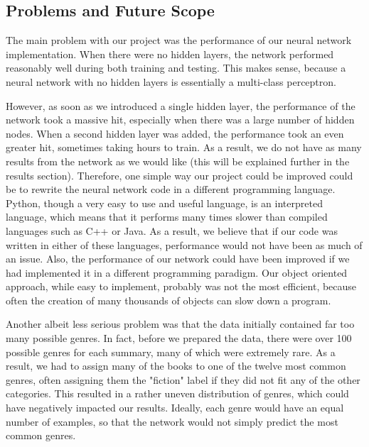 \documentclass[11pt,letterpaper]{article}
\begin{document}
\subsection{Problems and Future Scope}

The main problem with our project was the performance of our neural network implementation. When there were no hidden layers, the network performed reasonably well during both training and testing. This makes sense, because a neural network with no hidden layers is essentially a multi-class perceptron.

However, as soon as we introduced a single hidden layer, the performance of the network took a massive hit, especially when there was a large number of hidden nodes. When a second hidden layer was added, the performance took an even greater hit, sometimes taking hours to train. As a result, we do not have as many results from the network as we would like (this will be explained further in the results section). Therefore, one simple way our project could be improved could be to rewrite the neural network code in a different programming language. Python, though a very easy to use and useful language, is an interpreted language, which means that it performs many times slower than compiled languages such as C++ or Java. As a result, we believe that if our code was written in either of these languages, performance would not have been as much of an issue.
Also, the performance of our network could have been improved if we had implemented it in a different programming paradigm. Our object oriented approach, while easy to implement, probably was not the most efficient, because often the creation of many thousands of objects can slow down a program.

Another albeit less serious problem was that the data initially contained far too many possible genres. In fact, before we prepared the data, there were over 100 possible genres for each summary, many of which were extremely rare. As a result, we had to assign many of the books to one of the twelve most common genres, often assigning them the "fiction" label if they did not fit any of the other categories. This resulted in a rather uneven distribution of genres, which could have negatively impacted our results. Ideally, each genre would have an equal number of examples, so that the network would not simply predict the most common genres.
\end{document}

